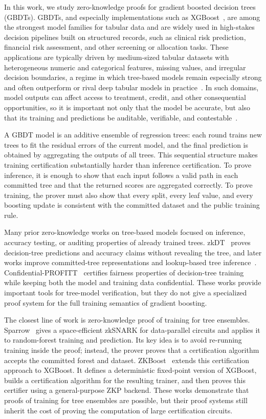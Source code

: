 In this work, we study zero-knowledge proofs for gradient boosted decision
trees (GBDTs). GBDTs, and especially implementations such as
XGBoost~\cite{xgboost16}, are among the strongest model families for tabular
data and are widely used in high-stakes decision pipelines built on structured
records, such as clinical risk prediction, financial risk assessment, and other
screening or allocation tasks. These applications are typically driven by
medium-sized tabular datasets with heterogeneous numeric and categorical
features, missing values, and irregular decision boundaries, a regime in which
tree-based models remain especially strong and often outperform or rival deep
tabular models in practice~\cite{shwartz2022tabular,grinsztajn2022tree,gorishniy2021revisiting}.
In such domains, model outputs can affect access to treatment, credit, and
other consequential opportunities, so it is important not only that the model
be accurate, but also that its training and predictions be auditable,
verifiable, and contestable~\cite{lima2022conflict,shahu2026faster}.

A GBDT model is an additive ensemble of regression
trees: each round trains new trees to fit the residual errors of the current
model, and the final prediction is obtained by aggregating the outputs of all
trees. This sequential structure makes training certification substantially
harder than inference certification. To prove inference, it is enough to show
that each input follows a valid path in each committed tree and that the
returned scores are aggregated correctly. To prove training, the prover must
also show that every split, every leaf value, and every boosting update is
consistent with the committed dataset and the public training rule.

Many prior zero-knowledge works on tree-based models focused on
inference, accuracy testing, or auditing properties of already trained trees.
zkDT~\cite{zkdt20} proves decision-tree predictions and accuracy claims without
revealing the tree, and later works improve committed-tree representations and
lookup-based tree inference~\cite{cq++24}. Confidential-PROFITT~\cite{confidential-profitt22}
certifies fairness properties of decision-tree training while keeping both the
model and training data confidential. These works provide important tools for
tree-model verification, but they do not give a specialized proof system for
the full training semantics of gradient boosting.

The closest line of work is zero-knowledge proof of training for tree
ensembles. Sparrow~\cite{sparrow24} gives a space-efficient zkSNARK for
data-parallel circuits and applies it to random-forest training and prediction.
Its key idea is to avoid re-running training inside the proof; instead, the
prover proves that a certification algorithm accepts the committed forest and
dataset. ZKBoost~\cite{zkboost26} extends this certification approach to XGBoost.
It defines a deterministic fixed-point version of XGBoost, builds a
certification algorithm for the resulting trainer, and then proves this
certifier using a general-purpose ZKP backend. These works demonstrate that
proofs of training for tree ensembles are possible, but their proof systems
still inherit the cost of proving the computation of large certification circuits.

